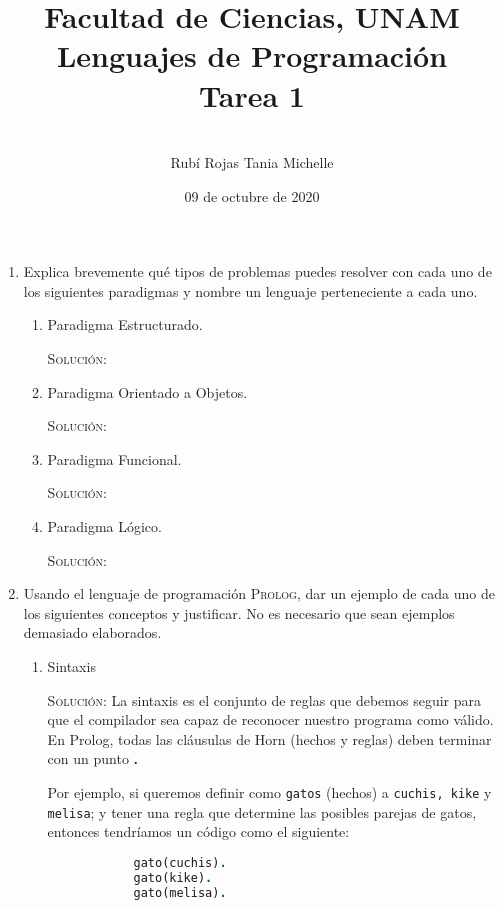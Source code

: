 \documentclass[letterpaper,11pt]{article}
\title{Facultad de Ciencias, UNAM \\ 
       Lenguajes de Programación \\ 
       Tarea 1}
\author{ \\ 
        Rubí Rojas Tania Michelle }
\date{09 de octubre de 2020}
\begin{document}
\maketitle

\begin{enumerate}
    \item Explica brevemente qué tipos de problemas puedes resolver con cada uno
    de los siguientes paradigmas y nombre un lenguaje perteneciente a cada uno.
    \begin{enumerate}
        \item Paradigma Estructurado.
        
        \textsc{Solución:}

        \item Paradigma Orientado a Objetos.

        \textsc{Solución:}

        \item Paradigma Funcional.

        \textsc{Solución:}

        \item Paradigma Lógico.

        \textsc{Solución:}
    \end{enumerate}

    \item Usando el lenguaje de programación \textsc{Prolog}, dar un ejemplo de 
    cada uno de los siguientes conceptos y justificar. No es necesario que sean 
    ejemplos demasiado elaborados.
    \begin{enumerate}
        \item Sintaxis

        \textsc{Solución:} La sintaxis es el conjunto de reglas que debemos 
        seguir para que el compilador sea capaz de reconocer nuestro programa 
        como válido. En Prolog, todas las cláusulas de Horn (hechos y reglas) 
        deben terminar con un punto \textbf{.} 

        Por ejemplo, si queremos definir como \texttt{gatos} (hechos) a 
        \texttt{cuchis, kike} y \texttt{melisa}; y tener una regla que 
        determine las posibles parejas de gatos, entonces tendríamos un código 
        como el siguiente:
        \begin{lstlisting}[language=Prolog]
            % Hechos
            gato(cuchis).
            gato(kike).
            gato(melisa).


\end{lstlisting}
\end{enumerate}
\end{enumerate}
\end{document}
